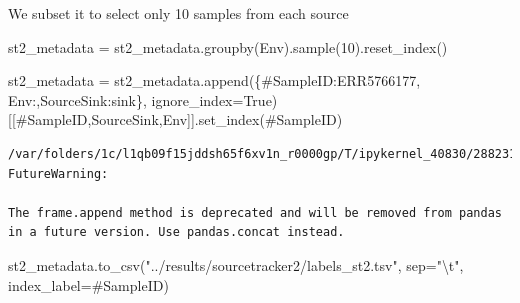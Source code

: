 \documentclass[
  letterpaper,
]{book}
\newenvironment{Shaded}{}{}
\newcommand{\CharTok}[1]{\textcolor[rgb]{0.01,0.18,0.38}{#1}}
\newcommand{\DecValTok}[1]{\textcolor[rgb]{0.00,0.36,0.77}{#1}}
\newcommand{\NormalTok}[1]{\textcolor[rgb]{0.14,0.16,0.18}{#1}}
\newcommand{\OperatorTok}[1]{\textcolor[rgb]{0.14,0.16,0.18}{#1}}
\newcommand{\StringTok}[1]{\textcolor[rgb]{0.01,0.18,0.38}{#1}}
\newcommand{\VariableTok}[1]{\textcolor[rgb]{0.89,0.38,0.04}{#1}}
\begin{document}
We subset it to select only 10 samples from each source

\begin{Shaded}
\begin{Highlighting}[]
\NormalTok{st2\_metadata }\OperatorTok{=}\NormalTok{ st2\_metadata.groupby(}\StringTok{\textquotesingle{}Env\textquotesingle{}}\NormalTok{).sample(}\DecValTok{10}\NormalTok{).reset\_index()}
\end{Highlighting}
\end{Shaded}

\begin{Shaded}
\begin{Highlighting}[]
\NormalTok{st2\_metadata }\OperatorTok{=}\NormalTok{ st2\_metadata.append(\{}\StringTok{\textquotesingle{}\#SampleID\textquotesingle{}}\NormalTok{:}\StringTok{\textquotesingle{}ERR5766177\textquotesingle{}}\NormalTok{, }\StringTok{\textquotesingle{}Env\textquotesingle{}}\NormalTok{:}\StringTok{\textquotesingle{}{-}\textquotesingle{}}\NormalTok{,}\StringTok{\textquotesingle{}SourceSink\textquotesingle{}}\NormalTok{:}\StringTok{\textquotesingle{}sink\textquotesingle{}}\NormalTok{\},}
\NormalTok{                                   ignore\_index}\OperatorTok{=}\VariableTok{True}\NormalTok{)[[}\StringTok{\textquotesingle{}\#SampleID\textquotesingle{}}\NormalTok{,}\StringTok{\textquotesingle{}SourceSink\textquotesingle{}}\NormalTok{,}\StringTok{\textquotesingle{}Env\textquotesingle{}}\NormalTok{]].set\_index(}\StringTok{\textquotesingle{}\#SampleID\textquotesingle{}}\NormalTok{)}
\end{Highlighting}
\end{Shaded}

\begin{verbatim}
/var/folders/1c/l1qb09f15jddsh65f6xv1n_r0000gp/T/ipykernel_40830/2882312005.py:1: FutureWarning:

The frame.append method is deprecated and will be removed from pandas in a future version. Use pandas.concat instead.
\end{verbatim}

\begin{Shaded}
\begin{Highlighting}[]
\NormalTok{st2\_metadata.to\_csv(}\StringTok{"../results/sourcetracker2/labels\_st2.tsv"}\NormalTok{, sep}\OperatorTok{=}\StringTok{"}\CharTok{\textbackslash{}t}\StringTok{"}\NormalTok{, index\_label}\OperatorTok{=}\StringTok{\textquotesingle{}\#SampleID\textquotesingle{}}\NormalTok{)}
\end{Highlighting}
\end{Shaded}
\end{document}
